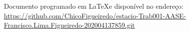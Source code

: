 
%
\begin{anexosenv}

\partanexos

Documento programado em \LaTeX  e disponível no endereço: \href{https://github.com/ChicoFigueiredo/estacio-Trab001-AASE-Francisco.Lima.Figueiredo-202004137859.git}{https://github.com/ChicoFigueiredo/estacio-Trab001-AASE-Francisco.Lima.Figueiredo-202004137859.git}\\


\end{anexosenv}
